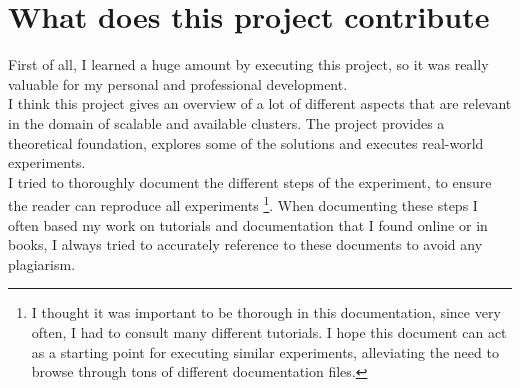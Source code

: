 \documentclass[12pt]{report}
\begin{document}
\section{What does this project contribute}
First of all, I learned a huge amount by executing this project, so it
was really valuable for my personal and professional development.\\
I think this project gives an overview of a lot of different aspects
that are relevant in the domain of scalable and available
clusters. The project provides a theoretical foundation, explores
some of the solutions and executes real-world experiments.\\
 I tried to
thoroughly document the different steps of the experiment, to ensure
the reader can reproduce all experiments \footnote{I thought it was
  important to be thorough in this documentation, since very often, I
  had to consult many different tutorials. I hope this document can
  act as a starting point for executing similar experiments,
  alleviating the need to browse through tons of different
  documentation files.}. When documenting these steps
I often based my work on tutorials and documentation that I found
online or in books, I always tried to accurately reference to these
documents to avoid any plagiarism.




{}


\end{document}
